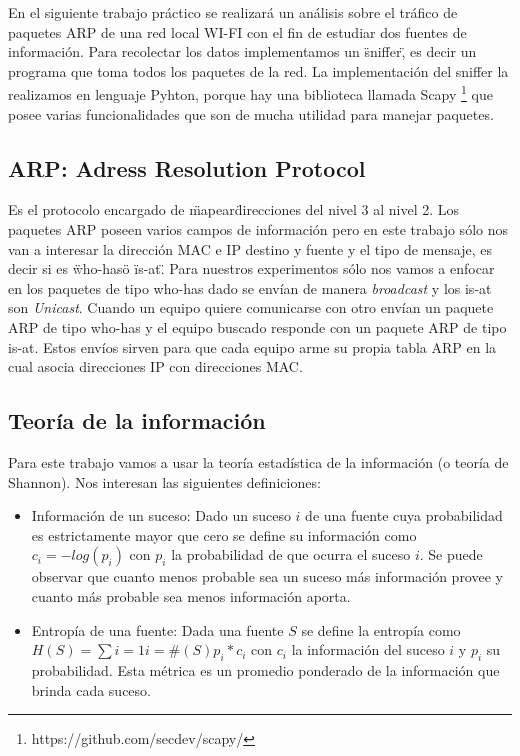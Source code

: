 En el siguiente trabajo pr\'actico se realizar\'a un an\'alisis sobre el tr\'afico de paquetes ARP de una red local WI-FI con el fin de estudiar dos fuentes de informaci\'on. Para recolectar los datos implementamos un \"sniffer\", es decir un programa que toma todos los paquetes de la red. La implementaci\'on del sniffer la realizamos en lenguaje Pyhton, porque hay una biblioteca llamada Scapy \footnote{https://github.com/secdev/scapy/} que posee varias funcionalidades que son de mucha utilidad para manejar paquetes. 

\subsection{ARP: Adress Resolution Protocol}

Es el protocolo encargado de \"mapear\" direcciones del nivel 3 al nivel 2. Los paquetes ARP poseen varios campos de informaci\'on pero en este trabajo s\'olo nos van a interesar la direcci\'on MAC e IP destino y fuente y el tipo de mensaje, es decir si es \"who-has\" o \"is-at\".
Para nuestros experimentos s\'olo nos vamos a enfocar en los paquetes de tipo who-has dado se env\'ian de manera \emph{broadcast} y los is-at son \emph{Unicast}. Cuando un equipo quiere comunicarse con otro env\'ian un paquete ARP de tipo who-has y el equipo buscado responde con un paquete ARP de tipo is-at. Estos env\'ios sirven para que cada equipo arme su propia tabla ARP en la cual asocia direcciones IP con direcciones MAC.

\subsection{Teor\'ia de la informaci\'on}

Para este trabajo vamos a usar la teor\'ia estad\'istica de la informaci\'on (o teor\'ia de Shannon). Nos interesan las siguientes definiciones:

\begin{itemize}

\item Informaci\'on de un suceso: Dado un suceso $i$ de una fuente cuya probabilidad es estrictamente mayor que cero se define su informaci\'on como $c_i = -log(p_i)$ con $p_i$ la probabilidad de que ocurra el suceso $i$. Se puede observar que cuanto menos probable sea un suceso m\'as informaci\'on provee y cuanto m\'as probable sea menos informaci\'on aporta.

\item Entrop\'ia de una fuente: Dada una fuente $S$ se define la entrop\'ia como $H(S) = \sum{i=1}{i=\#(S)} p_i*c_i$ con $c_i$ la informaci\'on del suceso $i$ y $p_i$ su probabilidad. Esta m\'etrica es un promedio ponderado de la informaci\'on que brinda cada suceso.  

\end{itemize}

